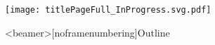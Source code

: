 \newcommand\blfootnote[1]{%
  \begingroup
  \renewcommand\thefootnote{}\footnote{{\tiny #1 }}%
  \addtocounter{footnote}{-1}%
  \endgroup
}

%	

\begin{frame}
\texttt{[image: titlePageFull\_InProgress.svg.pdf]}
\end{frame}
\begin{frame}<beamer>[noframenumbering]{Outline}
	\tableofcontents
\end{frame}

